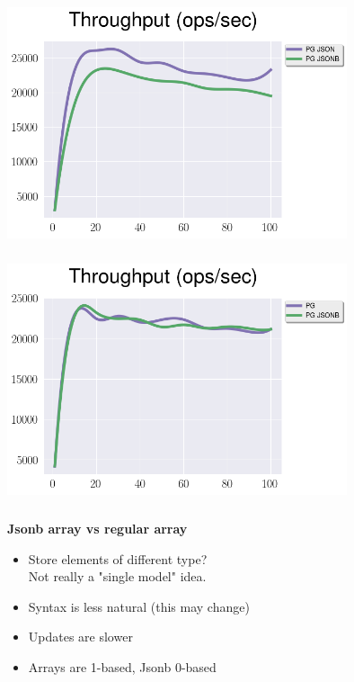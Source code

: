 \documentclass[usenames,dvipsnames, 18pt, compress, aspectratio=169]{beamer}
\begin{document}
\begin{frame}
    \frametitle{}
    \begin{center}

        \includegraphics[width=0.75\textwidth,center]{json_vs_jsonb_read.png}

    \end{center}
\end{frame}

\begin{frame}
    \frametitle{}
    \begin{center}

        \includegraphics[width=0.75\textwidth,center]{jsonb_vs_relation_read.png}

    \end{center}
\end{frame}

\begin{frame}
    \frametitle{}
    \begin{center}
        \textbf{Jsonb array vs regular array}

        \begin{itemize}[label={\MVRightarrow}]
            \item Store elements of different type?\\
                    Not really a "single model" idea.
            \item Syntax is less natural (this may change)
            \item Updates are slower
            \item Arrays are 1-based, Jsonb 0-based
        \end{itemize}

    \end{center}
\end{frame}
\end{document}
